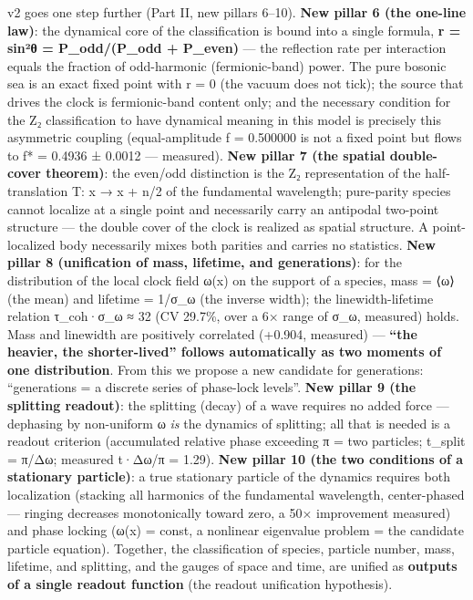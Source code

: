 \documentclass[
]{article}
\begin{document}
v2 goes one step further (Part II, new pillars 6--10). \textbf{New
pillar 6 (the one-line law)}: the dynamical core of the classification
is bound into a single formula, \textbf{r = sin²θ = P\_odd/(P\_odd +
P\_even)} --- the reflection rate per interaction equals the fraction of
odd-harmonic (fermionic-band) power. The pure bosonic sea is an exact
fixed point with r = 0 (the vacuum does not tick); the source that
drives the clock is fermionic-band content only; and the necessary
condition for the Z₂ classification to have dynamical meaning in this
model is precisely this asymmetric coupling (equal-amplitude f =
0.500000 is not a fixed point but flows to f* = 0.4936 ± 0.0012 ---
measured). \textbf{New pillar 7 (the spatial double-cover theorem)}: the
even/odd distinction is the Z₂ representation of the half-translation T:
x → x + n/2 of the fundamental wavelength; pure-parity species cannot
localize at a single point and necessarily carry an antipodal two-point
structure --- the double cover of the clock is realized as spatial
structure. A point-localized body necessarily mixes both parities and
carries no statistics. \textbf{New pillar 8 (unification of mass,
lifetime, and generations)}: for the distribution of the local clock
field ω(x) on the support of a species, mass = ⟨ω⟩ (the mean) and
lifetime = 1/σ\_ω (the inverse width); the linewidth-lifetime relation
τ\_coh·σ\_ω ≈ 32 (CV 29.7\%, over a 6× range of σ\_ω, measured) holds.
Mass and linewidth are positively correlated (+0.904, measured) ---
\textbf{``the heavier, the shorter-lived'' follows automatically as two
moments of one distribution}. From this we propose a new candidate for
generations: ``generations = a discrete series of phase-lock levels''.
\textbf{New pillar 9 (the splitting readout)}: the splitting (decay) of
a wave requires no added force --- dephasing by non-uniform ω \emph{is}
the dynamics of splitting; all that is needed is a readout criterion
(accumulated relative phase exceeding π = two particles; t\_split =
π/Δω; measured t·Δω/π = 1.29). \textbf{New pillar 10 (the two conditions
of a stationary particle)}: a true stationary particle of the dynamics
requires both localization (stacking all harmonics of the fundamental
wavelength, center-phased --- ringing decreases monotonically toward
zero, a 50× improvement measured) and phase locking (ω(x) = const, a
nonlinear eigenvalue problem = the candidate particle equation).
Together, the classification of species, particle number, mass,
lifetime, and splitting, and the gauges of space and time, are unified
as \textbf{outputs of a single readout function} (the readout
unification hypothesis).
\end{document}
